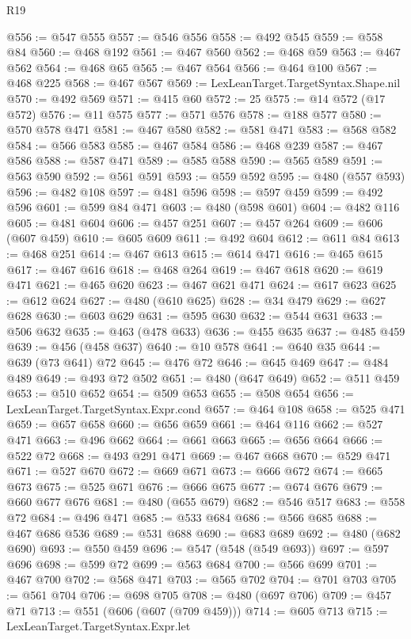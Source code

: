 \begin{lexlean}{R19}
\begin{coremodule}
@556 := @547 @555
@557 := @546 @556
@558 := @492 @545
@559 := @558 @84
@560 := @468 @192
@561 := @467 @560
@562 := @468 @59
@563 := @467 @562
@564 := @468 @65
@565 := @467 @564
@566 := @464 @100
@567 := @468 @225
@568 := @467 @567
@569 := LexLeanTarget.TargetSyntax.Shape.nil
@570 := @492 @569
@571 := @415 @60
@572 := 25
@575 := @14 @572 (@17 @572)
@576 := @11 @575
@577 := @571 @576
@578 := @188 @577
@580 := @570 @578 @471
@581 := @467 @580
@582 := @581 @471
@583 := @568 @582
@584 := @566 @583
@585 := @467 @584
@586 := @468 @239
@587 := @467 @586
@588 := @587 @471
@589 := @585 @588
@590 := @565 @589
@591 := @563 @590
@592 := @561 @591
@593 := @559 @592
@595 := @480 (@557 @593)
@596 := @482 @108
@597 := @481 @596
@598 := @597 @459
@599 := @492 @596
@601 := @599 @84 @471
@603 := @480 (@598 @601)
@604 := @482 @116
@605 := @481 @604
@606 := @457 @251
@607 := @457 @264
@609 := @606 (@607 @459)
@610 := @605 @609
@611 := @492 @604
@612 := @611 @84
@613 := @468 @251
@614 := @467 @613
@615 := @614 @471
@616 := @465 @615
@617 := @467 @616
@618 := @468 @264
@619 := @467 @618
@620 := @619 @471
@621 := @465 @620
@623 := @467 @621 @471
@624 := @617 @623
@625 := @612 @624
@627 := @480 (@610 @625)
@628 := @34 @479
@629 := @627 @628
@630 := @603 @629
@631 := @595 @630
@632 := @544 @631
@633 := @506 @632
@635 := @463 (@478 @633)
@636 := @455 @635
@637 := @485 @459
@639 := @456 (@458 @637)
@640 := @10 @578
@641 := @640 @35
@644 := @639 (@73 @641) @72
@645 := @476 @72
@646 := @645 @469
@647 := @484 @489
@649 := @493 @72 @502
@651 := @480 (@647 @649)
@652 := @511 @459
@653 := @510 @652
@654 := @509 @653
@655 := @508 @654
@656 := LexLeanTarget.TargetSyntax.Expr.cond
@657 := @464 @108
@658 := @525 @471
@659 := @657 @658
@660 := @656 @659
@661 := @464 @116
@662 := @527 @471
@663 := @496 @662
@664 := @661 @663
@665 := @656 @664
@666 := @522 @72
@668 := @493 @291 @471
@669 := @467 @668
@670 := @529 @471
@671 := @527 @670
@672 := @669 @671
@673 := @666 @672
@674 := @665 @673
@675 := @525 @671
@676 := @666 @675
@677 := @674 @676
@679 := @660 @677 @676
@681 := @480 (@655 @679)
@682 := @546 @517
@683 := @558 @72
@684 := @496 @471
@685 := @533 @684
@686 := @566 @685
@688 := @467 @686 @536
@689 := @531 @688
@690 := @683 @689
@692 := @480 (@682 @690)
@693 := @550 @459
@696 := @547 (@548 (@549 @693))
@697 := @597 @696
@698 := @599 @72
@699 := @563 @684
@700 := @566 @699
@701 := @467 @700
@702 := @568 @471
@703 := @565 @702
@704 := @701 @703
@705 := @561 @704
@706 := @698 @705
@708 := @480 (@697 @706)
@709 := @457 @71
@713 := @551 (@606 (@607 (@709 @459)))
@714 := @605 @713
@715 := LexLeanTarget.TargetSyntax.Expr.let

\end{coremodule}
\end{lexlean}
